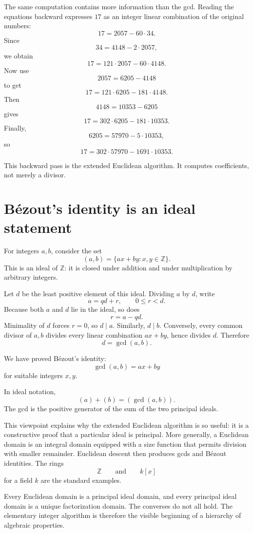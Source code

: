 The same computation contains more information than the gcd.  Reading the equations backward expresses \(17\) as an integer linear combination of the original numbers:
\[
  17=2057-60\cdot34.
\]
Since
\[
  34=4148-2\cdot2057,
\]
we obtain
\[
  17=121\cdot2057-60\cdot4148.
\]
Now use
\[
  2057=6205-4148
\]
to get
\[
  17=121\cdot6205-181\cdot4148.
\]
Then
\[
  4148=10353-6205
\]
gives
\[
  17=302\cdot6205-181\cdot10353.
\]
Finally,
\[
  6205=57970-5\cdot10353,
\]
so
\[
  \boxed{
  17=302\cdot57970-1691\cdot10353.}
\]

This backward pass is the extended Euclidean algorithm.  It computes coefficients, not merely a divisor.

\section{Bézout's identity is an ideal statement}

For integers \(a,b\), consider the set
\[
  (a,b)
  =\{ax+by:x,y\in\mathbb Z\}.
\]
This is an ideal of \(\mathbb Z\): it is closed under addition and under multiplication by arbitrary integers.

Let \(d\) be the least positive element of this ideal.  Dividing \(a\) by \(d\), write
\[
  a=qd+r,
  \qquad0\le r<d.
\]
Because both \(a\) and \(d\) lie in the ideal, so does
\[
  r=a-qd.
\]
Minimality of \(d\) forces \(r=0\), so \(d\mid a\).  Similarly, \(d\mid b\).  Conversely, every common divisor of \(a,b\) divides every linear combination \(ax+by\), hence divides \(d\).  Therefore
\[
  d=\gcd(a,b).
\]

We have proved Bézout's identity:
\[
  \boxed{
  \gcd(a,b)=ax+by
  }
\]
for suitable integers \(x,y\).

In ideal notation,
\[
  (a)+(b)=(\gcd(a,b)).
\]
The gcd is the positive generator of the sum of the two principal ideals.

This viewpoint explains why the extended Euclidean algorithm is so useful: it is a constructive proof that a particular ideal is principal.  More generally, a Euclidean domain is an integral domain equipped with a size function that permits division with smaller remainder.  Euclidean descent then produces gcds and Bézout identities.  The rings
\[
  \mathbb Z
  \qquad\text{and}\qquad
  k[x]
\]
for a field \(k\) are the standard examples.

Every Euclidean domain is a principal ideal domain, and every principal ideal domain is a unique factorization domain.  The converses do not all hold.  The elementary integer algorithm is therefore the visible beginning of a hierarchy of algebraic properties.

